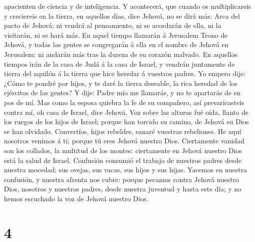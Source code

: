 apacienten de ciencia y de inteligencia.  Y acontecerá,
que cuando os multiplicareis y creciereis en la tierra, en aquellos
días, dice Jehová, no se dirá más: Arca del pacto de Jehová; ni vendrá
al pensamiento, ni se acordarán de ella, ni la visitarán, ni se hará
más.  En aquel tiempo llamarán á Jerusalem Trono de
Jehová, y todas las gentes se congregarán á ella en el nombre de Jehová
en Jerusalem: ni andarán más tras la dureza de su corazón malvado.
 En aquellos tiempos irán de la casa de Judá á la casa de
Israel, y vendrán juntamente de tierra del aquilón á la tierra que hice
heredar á vuestros padres.  Yo empero dije: ¿Cómo te
pondré por hijos, y te daré la tierra deseable, la rica heredad de los
ejércitos de las gentes? Y dije: Padre mío me llamarás, y no te
apartarás de en pos de mí.  Mas como la esposa quiebra la
fe de su compañero, así prevaricasteis contra mí, oh casa de Israel,
dice Jehová.  Voz sobre las alturas fué oída, llanto de
los ruegos de los hijos de Israel; porque han torcido su camino, de
Jehová su Dios se han olvidado.  Convertíos, hijos
rebeldes, sanaré vuestras rebeliones. He aquí nosotros venimos á ti;
porque tú eres Jehová nuestro Dios.  Ciertamente vanidad
son los collados, la multitud de los montes: ciertamente en Jehová
nuestro Dios está la salud de Israel.  Confusión consumió
el trabajo de nuestros padres desde nuestra mocedad; sus ovejas, sus
vacas, sus hijos y sus hijas.  Yacemos en nuestra
confusión, y nuestra afrenta nos cubre: porque pecamos contra Jehová
nuestro Dios, nosotros y nuestros padres, desde nuestra juventud y hasta
este día; y no hemos escuchado la voz de Jehová nuestro Dios.

\hypertarget{section-3}{%
\section{4}\label{section-3}}

